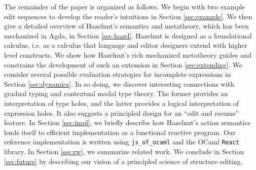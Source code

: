 




 



The remainder of the paper is organized as follows. We begin with two example edit sequences to develop the reader's intuitions in Section
    \ref{sec:example}. We then give a detailed overview of Hazelnut's semantics and metatheory, which has been mechanized in Agda, in Section \ref{sec:hazel}. Hazelnut is designed as a {foundational} calculus, i.e. as a calculus that language and editor designers extend with higher level constructs. We show how Hazelnut's rich mechanized metatheory guides and constrains the development of such an extension in Section \ref{sec:extending}.  We consider several possible evaluation strategies for incomplete expressions in Section \ref{sec:dynamics}. In so doing, we discover interesting connections with gradual typing and contextual modal type theory. The former provides an interpretation of type holes, and the latter provides a logical interpretation of expression holes. It also suggests a principled design for an ``edit and resume'' feature. In Section \ref{sec:impl}, we briefly describe how Hazelnut's action semantics lends itself to efficient implementation as a functional reactive program. Our reference implementation is written using \lstinline{js_of_ocaml} and the OCaml \lstinline{React} library. In Section \ref{sec:rw}, we summarize related work. We conclude in Section \ref{sec:future} by describing our vision of a principled science of structure editing.

